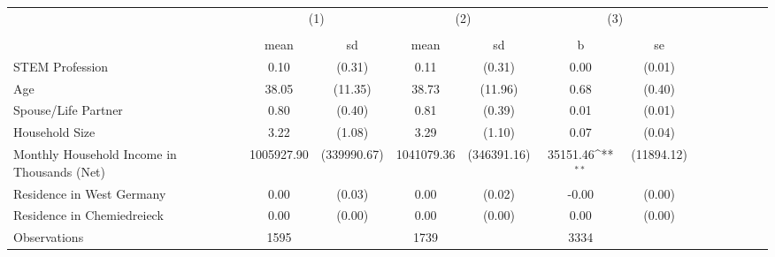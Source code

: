 {
\def\sym#1{\ifmmode^{#1}\else\(^{#1}\)\fi}
\begin{tabular}{l*{3}{cccc}}
\hline\hline
                    &\multicolumn{2}{c}{(1)}  &\multicolumn{2}{c}{(2)}  &\multicolumn{2}{c}{(3)}           \\
                    &\multicolumn{2}{c}{}     &\multicolumn{2}{c}{}     &\multicolumn{2}{c}{}              \\
                    &        mean&          sd&        mean&          sd&           b         &          se\\
\hline
STEM Profession     &        0.10&      (0.31)&        0.11&      (0.31)&        0.00         &      (0.01)\\
Age                 &       38.05&     (11.35)&       38.73&     (11.96)&        0.68         &      (0.40)\\
Spouse/Life Partner &        0.80&      (0.40)&        0.81&      (0.39)&        0.01         &      (0.01)\\
Household Size      &        3.22&      (1.08)&        3.29&      (1.10)&        0.07         &      (0.04)\\
Monthly Household Income in Thousands (Net)&  1005927.90& (339990.67)&  1041079.36& (346391.16)&    35151.46\sym{**} &  (11894.12)\\
Residence in West Germany&        0.00&      (0.03)&        0.00&      (0.02)&       -0.00         &      (0.00)\\
Residence in Chemiedreieck&        0.00&      (0.00)&        0.00&      (0.00)&        0.00         &      (0.00)\\
\hline
Observations        &        1595&            &        1739&            &        3334         &            \\
\hline\hline
\end{tabular}
}
